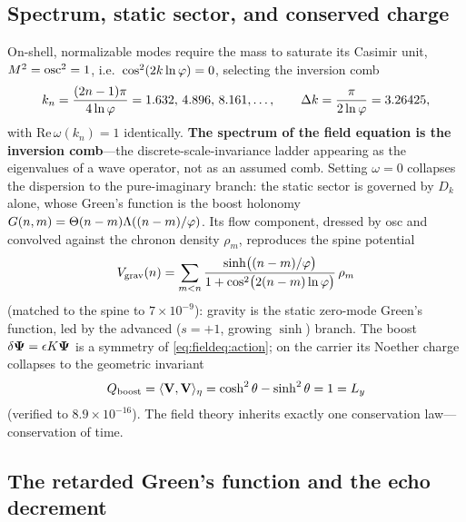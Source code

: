 \subsection{Spectrum, static sector, and conserved charge}

On-shell, normalizable modes require the mass to saturate its Casimir unit, $M^2=\operatorname{osc}^2=1$, i.e.\ $\cos^2(2k\ln\varphi)=0$, selecting the inversion comb
\begin{equation}
k_n=\frac{(2n-1)\pi}{4\ln\varphi}=1.632,\,4.896,\,8.161,\dots,\qquad \Delta k=\frac{\pi}{2\ln\varphi}=3.26425,
\label{eq:fieldeq:comb}
\end{equation}
with $\mathrm{Re}\,\omega(k_n)=1$ identically. \textbf{The spectrum of the field equation is the inversion comb}---the discrete-scale-invariance ladder appearing as the eigenvalues of a wave operator, not as an assumed comb. Setting $\omega=0$ collapses the dispersion to the pure-imaginary branch: the static sector is governed by $D_k$ alone, whose Green's function is the boost holonomy $G(n,m)=\Theta(n-m)\Lambda((n-m)/\varphi)$. Its flow component, dressed by osc and convolved against the chronon density $\rho_m$, reproduces the spine potential
\begin{equation}
V_{\text{grav}}(n)=\sum_{m<n}\frac{\sinh\!\big((n-m)/\varphi\big)}{1+\cos^2\!\big(2(n-m)\ln\varphi\big)}\,\rho_m
\label{eq:fieldeq:Vgrav}
\end{equation}
(matched to the spine to $7\times10^{-9}$): gravity is the static zero-mode Green's function, led by the advanced ($s=+1$, growing $\sinh$) branch. The boost $\delta\boldsymbol\Psi=\epsilon K\boldsymbol\Psi$ is a symmetry of \eqref{eq:fieldeq:action}; on the carrier its Noether charge collapses to the geometric invariant
\begin{equation}
Q_{\text{boost}}=\langle\mathbf{V},\mathbf{V}\rangle_\eta=\cosh^2\theta-\sinh^2\theta=1=L_{y}
\label{eq:fieldeq:noether}
\end{equation}
(verified to $8.9\times10^{-16}$). The field theory inherits exactly one conservation law---conservation of time.

\subsection{The retarded Green's function and the echo decrement}

